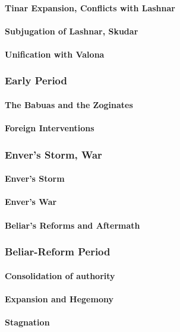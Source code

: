 			
		\paragraph{Tinar Expansion, Conflicts with Lashnar}
		\paragraph{Subjugation of Lashnar, Skudar}
		\paragraph{Unification with Valona}
	\subsubsection{Early Period}
		\paragraph{The Babuas and the Zoginates}
		\paragraph{Foreign Interventions}
	\subsubsection{Enver's Storm, War}
		\paragraph{Enver's Storm}
		\paragraph{Enver's War}
		\paragraph{Beliar's Reforms and Aftermath}
	\subsubsection{Beliar-Reform Period}
		\paragraph{Consolidation of authority}
		\paragraph{Expansion and Hegemony}
		\paragraph{Stagnation}
